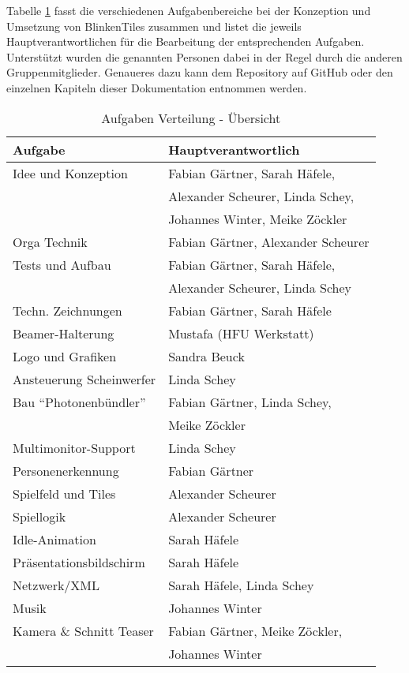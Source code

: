 
Tabelle \ref{tab:aufgaben} fasst die verschiedenen Aufgabenbereiche bei der Konzeption und Umsetzung von BlinkenTiles zusammen und listet die jeweils Hauptverantwortlichen für die Bearbeitung der entsprechenden Aufgaben. Unterstützt wurden die genannten Personen dabei in der Regel durch die anderen Gruppenmitglieder. Genaueres dazu kann dem Repository auf GitHub oder den einzelnen Kapiteln dieser Dokumentation entnommen werden.

\vspace{0.8em}

\begin{table}[hc]
\begin{center}
\begin{tabular}[hc]{l|l}
\textbf{Aufgabe} & \textbf{Hauptverantwortlich}\\
\hline
Idee und Konzeption& Fabian Gärtner, Sarah Häfele,\\
&Alexander Scheurer, Linda Schey,\\
&Johannes Winter, Meike Zöckler\\\hline
Orga Technik& Fabian Gärtner, Alexander Scheurer\\\hline
Tests und Aufbau& Fabian Gärtner, Sarah Häfele,\\
&Alexander Scheurer, Linda Schey\\\hline
Techn. Zeichnungen& Fabian Gärtner, Sarah Häfele\\\hline
Beamer-Halterung& Mustafa (HFU Werkstatt)\\\hline
Logo und Grafiken& Sandra Beuck\\\hline
Ansteuerung Scheinwerfer&Linda Schey\\\hline
Bau \enquote{Photonenbündler}&Fabian Gärtner, Linda Schey, \\&Meike Zöckler\\\hline
Multimonitor-Support& Linda Schey\\\hline
Personenerkennung& Fabian Gärtner\\\hline
Spielfeld und Tiles& Alexander Scheurer\\\hline
Spiellogik& Alexander Scheurer\\\hline
Idle-Animation& Sarah Häfele\\\hline
Präsentationsbildschirm& Sarah Häfele\\\hline
Netzwerk/XML& Sarah Häfele, Linda Schey\\\hline
Musik& Johannes Winter\\\hline
Kamera \& Schnitt Teaser&Fabian Gärtner, Meike Zöckler,\\&Johannes Winter\\
\hline
\end{tabular}
\caption{Aufgaben Verteilung - Übersicht}
\label{tab:aufgaben}
\end{center}
\end{table}
